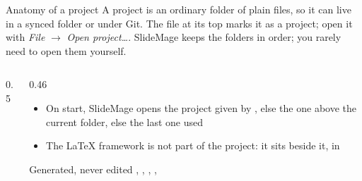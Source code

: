 
\begin{standardframe}{Anatomy of a project}
	\small
	A project is an ordinary folder of plain files, so it can live in a synced
	folder or under Git. The file  at its top marks it as a
	project; open it with \emph{File} $\rightarrow$ \emph{Open project\ldots}. SlideMage keeps
	the folders in order; you rarely need to open them yourself.
	\par
	\begin{columns}[T,onlytextwidth]
		\begin{column}{0.5\linewidth}
		\end{column}
		\begin{column}{0.46\linewidth}
			\begin{itemize}
				\item On start, SlideMage opens the project given by , else the one above the current folder, else the last one used
				\item The LaTeX framework is not part of the project: it sits beside it, in 
			\end{itemize}
			\medskip
			\begin{infoblock}{Generated, never edited}
				, , , , 
			\end{infoblock}
		\end{column}
	\end{columns}
\end{standardframe}
